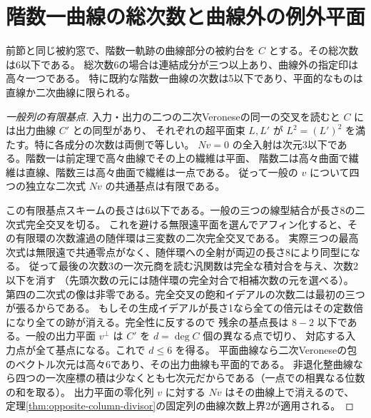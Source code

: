 \section{階数一曲線の総次数と曲線外の例外平面}
\label{sec:rank-one-curve-degree-bound}
\begin{theorem}\label{thm:rank-one-curve-degree-bound}
前節と同じ被約窓で、階数一軌跡の曲線部分の被約台を $C$ とする。その総次数は6以下である。
総次数6の場合は連結成分が三つ以上あり、曲線外の指定印は高々一つである。
特に既約な階数一曲線の次数は5以下であり、平面的なものは直線か二次曲線に限られる。
\end{theorem}
\begin{proof}[一般列の有限基点]
入力・出力の二つの二次Veroneseの同一の交叉を読むと $C$ には出力曲線 $C'$ との同型があり、
それぞれの超平面束 $L,L'$ が $L^2=(L')^2$ を満たす。特に各成分の次数は両側で等しい。
$Nv=0$ の全入射は次元3以下である。階数一は前定理で高々曲線でその上の繊維は平面、
階数二は高々曲面で繊維は直線、階数三は高々曲面で繊維は一点である。
従って一般の $v$ について四つの独立な二次式 $Nv$ の共通基点は有限である。

この有限基点スキームの長さは6以下である。一般の三つの線型結合が長さ8の二次式完全交叉を切る。
これを避ける無限遠平面を選んでアフィン化すると、その有限環の次数濾過の随伴環は三変数の二次完全交叉である。
実際三つの最高次式は無限遠で共通零点がなく、随伴環への全射が両辺の長さ8により同型になる。
従って最後の次数3の一次元商を読む汎関数は完全な積対合を与え、次数2以下を消す
（先頭次数の元には随伴環の完全対合で相補次数の元を選べる）。
第四の二次式の像は非零である。完全交叉の飽和イデアルの次数二は最初の三つが張るからである。
もしその生成イデアルが長さ1なら全ての倍元はその定数倍になり全ての跡が消える。完全性に反するので
残余の基点長は $8-2$ 以下である。一般の出力平面 $v^\perp$ は $C'$ を $d=\deg C$ 個の異なる点で切り、
対応する入力点が全て基点になる。これで $d\le6$ を得る。
平面曲線なら二次Veroneseの包のベクトル次元は高々6であり、その出力曲線も平面的である。
非退化整曲線なら四つの一次座標の積は少なくとも七次元だからである（一点での相異なる位数の和を取る）。
出力平面の零化列 $v$ に対する $Nv$ はその曲線上で消えるので、
定理\ref{thm:opposite-column-divisor}の固定列の曲線次数上界2が適用される。
\end{proof}
